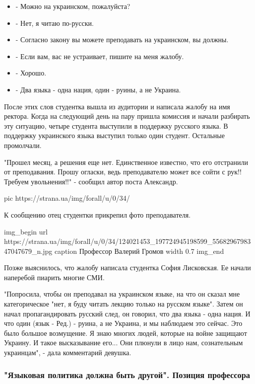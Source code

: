 \begin{itemize}
\item - Можно на украинском, пожалуйста?
\item - Нет, я читаю по-русски.
\item - Согласно закону вы можете преподавать на украинском, вы должны.
\item - Если вам, вас не устраивает, пишите на меня жалобу.
\item - Хорошо.
\item - Два языка - одна нация, один - руины, а не Украина.
\end{itemize}


После этих слов студентка вышла из аудитории и написала жалобу на имя ректора.
Когда на следующий день на пару пришла комиссия и начали разбирать эту
ситуацию, четыре студента выступили в поддержку русского языка. В поддержку
украинского языка выступил только один студент. Остальные промолчали.

"Прошел месяц, а решения еще нет. Единственное известно, что его отстранили от
преподавания. Прошу огласки, ведь преподавателю может все сойти с рук!! Требуем
увольнения!!" - сообщил автор поста Александр.

\ifcmt
pic https://strana.ua/img/forall/u/0/34/%
\fi

К сообщению отец студентки прикрепил фото преподавателя.

\ifcmt
img_begin 
	url https://strana.ua/img/forall/u/0/34/124021453_197724945198599_5568296798347047679_n.jpg
	caption Профессор Валерий Громов
	width 0.7
img_end
\fi

Позже выяснилось, что жалобу написала студентка София Лисковская. Ее начали
наперебой пиарить многие СМИ.

"Попросила, чтобы он преподавал на украинском языке, на что он сказал мне
категорическое "нет, я буду читать лекцию только на русском языке". Затем он
начал пропагандировать русский след, он говорил, что два языка - одна нация. И
что один (язык - Ред.) - руина, а не Украина, и мы наблюдаем это сейчас. Это
было большое возмущение. Я знаю многих людей, которые на войне защищают
Украину. И такое высказывание его... Они плюнули в лицо нам, сознательным
украинцам", - дала комментарий девушка.


\subsubsection{"Языковая политика должна быть другой". Позиция профессора}

